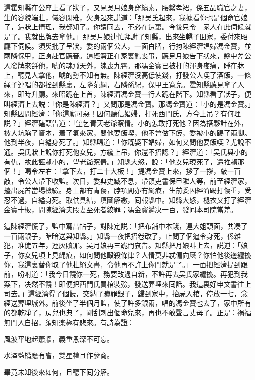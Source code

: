 這霍知縣在公座上看了狀子，又見吳月娘身穿縞素，腰繫孝裙，係五品職官之妻，生的容貌端莊，儀容閑雅，欠身起來説道：「那吴氏起來，我據看你也是個命官娘子，這狀上情理，我都知了。你請囘去，不必在這裏。今後只令一家人在此伺候就是了。我就出牌去拿他。」那吴月娘連忙拜謝了知縣，出來坐轎子囬家，委付來昭廳下伺候。須臾批了呈狀，委的兩個公人，一面白牌，行拘陳經濟娼婦馮金寳，並兩隣保甲，正身赴官聽審。這經濟正在家裏亂丧事，聽見月娘告下狀來，縣中差公人發牌來㧱他，唬的魂飛天外，魄喪九霄。那馮金寳已被打的渾身疼痛，睡在牀上，聽見人拿他，唬的勢不知有無。陳經濟沒高低使錢，打發公人喫了酒飯，一條䋲子連唱的都拴到縣裏，左隣范綱，右隣孫紀，保甲王寬兒。霍知縣聽見拿了人來，即時升廳。來昭跪在上首，陳經濟馮金寳一行人跪在階下。知縣看了狀子，便叫經濟上去説：「你是陳經濟？」又問那是馮金寳。那馮金寳道：「小的是馮金寳。」知縣因問經濟：「你這廝可惡！因何聽信娼婦，打死西門氏，方今上吊？有何理説？」經濟磕頭告道：「望乞青天老爺察情。小的怎敢打死他？因為搭夥計在外，被人坑陷了資本，着了氣來家，問他要飯喫，他不曾做下飯，委被小的踢了兩脚。他到半夜，自縊身死了。」知縣喝道：「你旣娶下娼婦，如何又問他要飯喫？尤說不通。吳氏狀上說你打死他女兒，方纔上吊，你還不招認？」經濟道：「吴氏與小的有仇，故此誣賴小的，望老爺察情。」知縣大怒，說：「他女兒現死了，還推賴那個！」喝令左右：「拿下去，打二十大板！」提馮金寳上來，拶了一拶，敲一百敲，令公人帶下收監。次日，委典史臧不息，帶領吏書保甲隣人等，前至經濟家，擡出屍首當場檢驗。身上都有青傷，脖項間亦有䋲痕，生前委因經濟踢打傷重，受忍不過，自縊身死。取供具結，填圖解繳，囘報縣中。知縣大怒，褪衣又打了經濟金寶十板，問陳經濟夫毆妻至死者絞罪；馮金寳遞决一百，發囘本司院當差。

這陳經濟慌了，監中寫出帖子，對陳定説：「把布舖中本錢，連大姐頭面，共凑了一百兩銀子，暗暗送與知縣。」知縣一夜把招卷改了，止問了個逼令身死，係雜犯，准徒五年，運灰贖罪。吴月娘再三跪門哀告。知縣把月娘叫上去，説道：「娘子，你女兒項上見䋲痕，如何問他毆殺條律？人情莫非忒偏向麽？你怕他後邊纏擾你，我這裏替你取了他杜絕文書，令他再不許上你門就是了。」一面把經濟提到跟前，吩咐道：「我今日饒你一死，務要改過自新，不許再去吴氏家纏擾。再犯到我案下，决然不饒！即便把西門氏買棺裝殮，發送葬埋來囘話。我這裏好申文書往上司去。」這經濟得了個饒，交納了贖罪銀子，歸到家中，抬屍入棺，停放一七，念經送葬埋城外。前後坐了半個月監，使了許多銀兩，唱的馮金寳也去了，家中所有的都乾凈了，房兒也典了，剛刮剌出個命兒來，再也不敢聲言丈母了。正是：祸福無門人自招，須知楽極有悲來。有詩為證：

風波平地起蕭牆，義重恩深不可忘。

水溢藍橋應有會，雙星權且作參商。

畢竟未知後來如何，且聽下囘分解。

